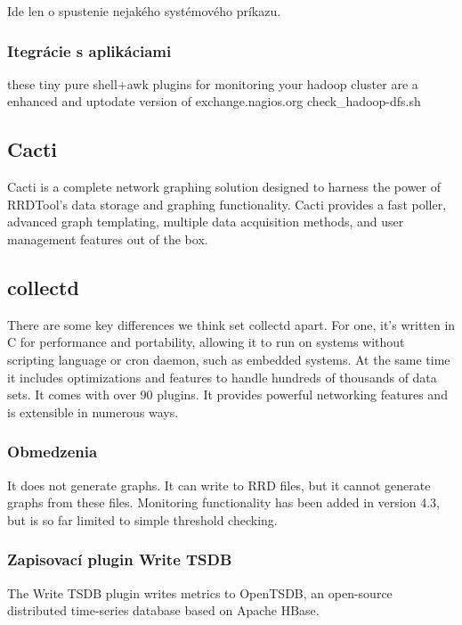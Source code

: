 \documentclass[11pt,final,oneside]{fithesis}
\begin{document}
Ide len o spustenie nejakého systémového príkazu.
\cite{09}

\subsubsection{Itegrácie s aplikáciami} 
these tiny pure shell+awk plugins for monitoring your hadoop cluster are a enhanced and uptodate version of exchange.nagios.org check_hadoop-dfs.sh
\cite{10}

\subsection{Cacti}
Cacti is a complete network graphing solution designed to harness the power of RRDTool's data storage and graphing functionality. Cacti provides a fast poller, advanced graph templating, multiple data acquisition methods, and user management features out of the box.
\cite{11}

\subsection{collectd}
There are some key differences we think set collectd apart. For one, it's written in C for performance and portability, allowing it to run on systems without scripting language or cron daemon, such as embedded systems. 
At the same time it includes optimizations and features to handle hundreds of thousands of data sets. It comes with over 90 plugins. It provides powerful networking features and is extensible in numerous ways. 

\subsubsection{Obmedzenia}
It does not generate graphs. It can write to RRD files, but it cannot generate graphs from these files. 
Monitoring functionality has been added in version 4.3, but is so far limited to simple threshold checking. 
\cite{12}

\subsubsection{Zapisovací plugin Write TSDB}
The Write TSDB plugin writes metrics to OpenTSDB, an open-source distributed time-series database based on Apache HBase.
\cite{13}
\end{document}
